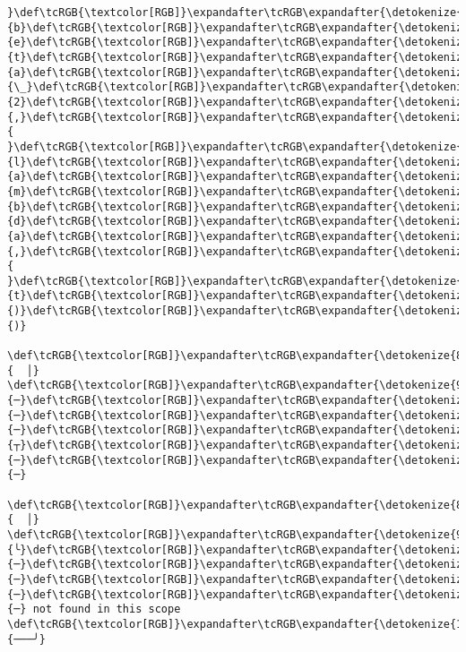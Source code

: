 \documentclass[11pt]{article}
\begin{document}
\begin{Verbatim}[commandchars=\\\{\}, frame=single, framerule=2mm, rulecolor=\color{outerrorbackground}]
}\def\tcRGB{\textcolor[RGB]}\expandafter\tcRGB\expandafter{\detokenize{178,178,178}}{b}\def\tcRGB{\textcolor[RGB]}\expandafter\tcRGB\expandafter{\detokenize{178,178,178}}{e}\def\tcRGB{\textcolor[RGB]}\expandafter\tcRGB\expandafter{\detokenize{178,178,178}}{t}\def\tcRGB{\textcolor[RGB]}\expandafter\tcRGB\expandafter{\detokenize{178,178,178}}{a}\def\tcRGB{\textcolor[RGB]}\expandafter\tcRGB\expandafter{\detokenize{178,178,178}}{\_}\def\tcRGB{\textcolor[RGB]}\expandafter\tcRGB\expandafter{\detokenize{178,178,178}}{2}\def\tcRGB{\textcolor[RGB]}\expandafter\tcRGB\expandafter{\detokenize{178,178,178}}{,}\def\tcRGB{\textcolor[RGB]}\expandafter\tcRGB\expandafter{\detokenize{178,178,178}}{ }\def\tcRGB{\textcolor[RGB]}\expandafter\tcRGB\expandafter{\detokenize{95,0,135}}{l}\def\tcRGB{\textcolor[RGB]}\expandafter\tcRGB\expandafter{\detokenize{95,0,135}}{a}\def\tcRGB{\textcolor[RGB]}\expandafter\tcRGB\expandafter{\detokenize{95,0,135}}{m}\def\tcRGB{\textcolor[RGB]}\expandafter\tcRGB\expandafter{\detokenize{95,0,135}}{b}\def\tcRGB{\textcolor[RGB]}\expandafter\tcRGB\expandafter{\detokenize{95,0,135}}{d}\def\tcRGB{\textcolor[RGB]}\expandafter\tcRGB\expandafter{\detokenize{95,0,135}}{a}\def\tcRGB{\textcolor[RGB]}\expandafter\tcRGB\expandafter{\detokenize{178,178,178}}{,}\def\tcRGB{\textcolor[RGB]}\expandafter\tcRGB\expandafter{\detokenize{178,178,178}}{ }\def\tcRGB{\textcolor[RGB]}\expandafter\tcRGB\expandafter{\detokenize{178,178,178}}{t}\def\tcRGB{\textcolor[RGB]}\expandafter\tcRGB\expandafter{\detokenize{178,178,178}}{)}\def\tcRGB{\textcolor[RGB]}\expandafter\tcRGB\expandafter{\detokenize{178,178,178}}{)}
 \def\tcRGB{\textcolor[RGB]}\expandafter\tcRGB\expandafter{\detokenize{88,88,88}}{  │}                                         \def\tcRGB{\textcolor[RGB]}\expandafter\tcRGB\expandafter{\detokenize{95,0,135}}{─}\def\tcRGB{\textcolor[RGB]}\expandafter\tcRGB\expandafter{\detokenize{95,0,135}}{─}\def\tcRGB{\textcolor[RGB]}\expandafter\tcRGB\expandafter{\detokenize{95,0,135}}{─}\def\tcRGB{\textcolor[RGB]}\expandafter\tcRGB\expandafter{\detokenize{95,0,135}}{┬}\def\tcRGB{\textcolor[RGB]}\expandafter\tcRGB\expandafter{\detokenize{95,0,135}}{─}\def\tcRGB{\textcolor[RGB]}\expandafter\tcRGB\expandafter{\detokenize{95,0,135}}{─}  
 \def\tcRGB{\textcolor[RGB]}\expandafter\tcRGB\expandafter{\detokenize{88,88,88}}{  │}                                            \def\tcRGB{\textcolor[RGB]}\expandafter\tcRGB\expandafter{\detokenize{95,0,135}}{╰}\def\tcRGB{\textcolor[RGB]}\expandafter\tcRGB\expandafter{\detokenize{95,0,135}}{─}\def\tcRGB{\textcolor[RGB]}\expandafter\tcRGB\expandafter{\detokenize{95,0,135}}{─}\def\tcRGB{\textcolor[RGB]}\expandafter\tcRGB\expandafter{\detokenize{95,0,135}}{─}\def\tcRGB{\textcolor[RGB]}\expandafter\tcRGB\expandafter{\detokenize{95,0,135}}{─} not found in this scope
\def\tcRGB{\textcolor[RGB]}\expandafter\tcRGB\expandafter{\detokenize{148,148,148}}{───╯}
    \end{Verbatim}


    
    
    
\end{document}
